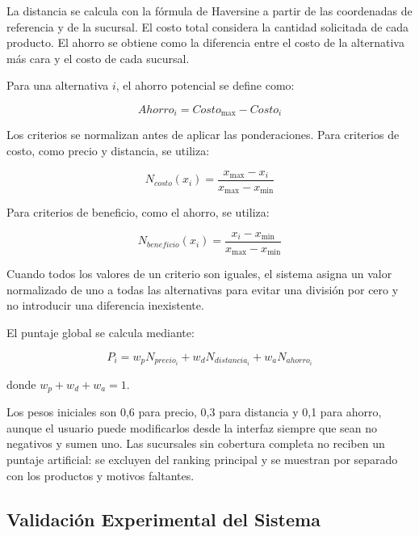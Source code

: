 La distancia se calcula con la fórmula de Haversine a partir de las coordenadas
de referencia y de la sucursal. El costo total considera la cantidad solicitada
de cada producto. El ahorro se obtiene como la diferencia entre el costo de la
alternativa más cara y el costo de cada sucursal.

Para una alternativa $i$, el ahorro potencial se define como:

\begin{equation}
Ahorro_i = Costo_{\max} - Costo_i
\label{eq:ahorro_potencial_alineado}
\end{equation}

Los criterios se normalizan antes de aplicar las ponderaciones. Para criterios
de costo, como precio y distancia, se utiliza:

\begin{equation}
N_{costo}(x_i) =
\frac{x_{\max} - x_i}{x_{\max} - x_{\min}}
\label{eq:normalizacion_costo_alineada}
\end{equation}

Para criterios de beneficio, como el ahorro, se utiliza:

\begin{equation}
N_{beneficio}(x_i) =
\frac{x_i - x_{\min}}{x_{\max} - x_{\min}}
\label{eq:normalizacion_beneficio_alineada}
\end{equation}

Cuando todos los valores de un criterio son iguales, el sistema asigna un valor
normalizado de uno a todas las alternativas para evitar una división por cero y
no introducir una diferencia inexistente.

El puntaje global se calcula mediante:

\begin{equation}
P_i = w_p N_{precio_i} + w_d N_{distancia_i} + w_a N_{ahorro_i}
\label{eq:puntaje_final_alineado}
\end{equation}

donde $w_p + w_d + w_a = 1$.

Los pesos iniciales son 0,6 para precio, 0,3 para distancia y 0,1 para ahorro,
aunque el usuario puede modificarlos desde la interfaz siempre que sean no
negativos y sumen uno. Las sucursales sin cobertura completa no reciben un
puntaje artificial: se excluyen del ranking principal y se muestran por separado
con los productos y motivos faltantes.

\subsection{Validación Experimental del Sistema}

